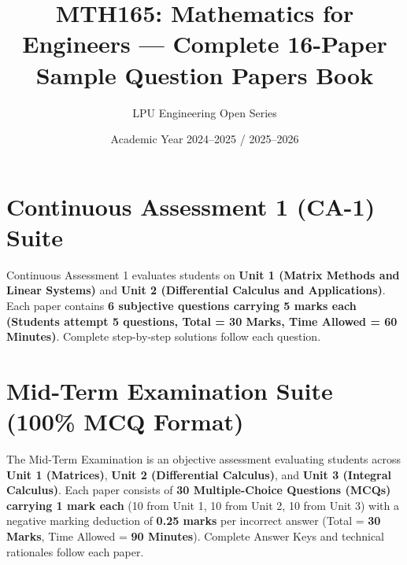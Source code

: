 \documentclass[a4paper,11pt,oneside,openany]{book}
\title{MTH165: Mathematics for Engineers --- Complete 16-Paper Sample Question Papers Book}
\author{LPU Engineering Open Series}
\date{Academic Year 2024--2025 / 2025--2026}
\begin{document}
\frontmatter



\tableofcontents
\newpage

\mainmatter

\chapter{Continuous Assessment 1 (CA-1) Suite}
\label{chap:ca1_suite}
\noindent
Continuous Assessment 1 evaluates students on \textbf{Unit 1 (Matrix Methods and Linear Systems)} and \textbf{Unit 2 (Differential Calculus and Applications)}. Each paper contains \textbf{6 subjective questions carrying 5 marks each (Students attempt 5 questions, Total = 30 Marks, Time Allowed = 60 Minutes)}. Complete step-by-step solutions follow each question.

\newpage

\newpage

\newpage

\newpage


\chapter{Mid-Term Examination Suite (100\% MCQ Format)}
\label{chap:midterm_suite}
\noindent
The Mid-Term Examination is an objective assessment evaluating students across \textbf{Unit 1 (Matrices)}, \textbf{Unit 2 (Differential Calculus)}, and \textbf{Unit 3 (Integral Calculus)}. Each paper consists of \textbf{30 Multiple-Choice Questions (MCQs) carrying 1 mark each} (10 from Unit 1, 10 from Unit 2, 10 from Unit 3) with a negative marking deduction of \textbf{0.25 marks} per incorrect answer (Total = \textbf{30 Marks}, Time Allowed = \textbf{90 Minutes}). Complete Answer Keys and technical rationales follow each paper.

\newpage

\newpage

\newpage

\newpage


\end{document}
